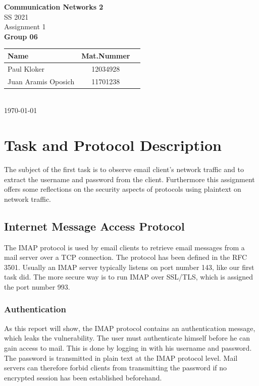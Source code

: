 \documentclass[parskip=full]{scrartcl}
\begin{document}
\begin{titlepage}
    \centering
    \vspace*{2cm}
    {\Huge \textbf{Communication Networks 2}}\\
    SS 2021\\
    \vspace*{1cm}
    {\Large Assignment 1}
    \\\vspace*{3cm}
    {\Large \textbf{Group 06}}\\
    \vspace*{1cm}
    {\large 
        \begin{tabular}{l c c}
            Name & Mat.Nummer \\ \hline
            Paul Kloker & 12034928 \\
            Juan Aramis Oposich & 11701238
        \end{tabular}
    }
    \\\vspace*{7cm}
    \today
\end{titlepage}

\section{Task and Protocol Description}

The subject of the first task is to observe email client’s network traffic and to extract the username and password from the client.  Furthermore this assignment offers some reflections on the security aspects of protocols using plaintext on network traffic.

\subsection{Internet Message Access Protocol}
The IMAP protocol is used by email clients to retrieve email messages from a mail server over a TCP connection. The protocol has been defined in the RFC 3501. Usually an IMAP server typically listens on port number 143, like our first task did. The more secure way is to run IMAP over SSL/TLS, which is assigned the port number 993.

\subsubsection{Authentication}
As this report will show, the IMAP protocol contains an authentication message, which leaks the vulnerability. The user must authenticate himself before he can gain access to mail. This is done by logging in with his username and password. The password is transmitted in plain text at the IMAP protocol level. Mail servers can therefore forbid clients from transmitting the password if no encrypted session has been established beforehand.\\
\end{document}
